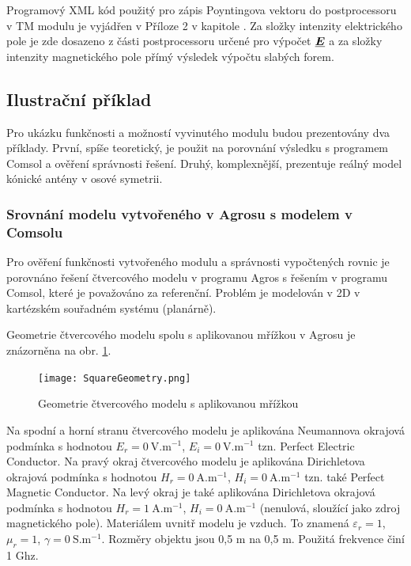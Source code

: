 \documentclass[12pt,a4paper,oneside]{article}
\numberwithin{equation}{section} %
\numberwithin{figure}{section} %
\numberwithin{table}{section} %
\renewcommand{\vec}[1]{\mbox{\boldmath$#1$}} %
\newcommand{\faz}[1]{{\underline{#1}}} %
\begin{document}
Programový XML kód použitý pro zápis Poyntingova vektoru do postprocessoru v TM modulu je vyjádřen v Příloze 2 v kapitole . Za složky intenzity elektrického pole je zde dosazeno z části postprocessoru určené pro výpočet $\faz{\vec{E}}$ a za složky intenzity magnetického pole přímý výsledek výpočtu slabých forem.



\subsection{Ilustrační příklad}
Pro ukázku funkčnosti a možností vyvinutého modulu budou prezentovány dva příklady. První, spíše teoretický, je použit na porovnání výsledku s programem Comsol a ověření správnosti řešení. Druhý, komplexnější, prezentuje reálný model kónické antény v osové symetrii. 

\subsubsection{Srovnání modelu vytvořeného v Agrosu s modelem v Comsolu}
\label{srovnani}
Pro ověření funkčnosti vytvořeného modulu a správnosti vypočtených rovnic je porovnáno řešení čtvercového modelu v programu Agros s řešením v programu Comsol, které je považováno za referenční. Problém je modelován v 2D v kartézském souřadném systému (planárně).

Geometrie čtvercového modelu spolu s aplikovanou mřížkou v Agrosu je znázorněna na obr. \ref{meshedSQ}. 

\begin{figure}
\begin{center}
\texttt{[image: SquareGeometry.png]} 
\caption{Geometrie čtvercového modelu s aplikovanou mřížkou} 
\label{meshedSQ}
\end{center}
\end{figure}

Na spodní a horní stranu čtvercového modelu je aplikována Neumannova okrajová podmínka s hodnotou $E_r = 0 ~ \mathrm{V.m^{-1}}$, $E_i = 0 ~ \mathrm{V.m^{-1}}$ tzn. Perfect Electric Conductor. Na pravý okraj čtvercového modelu je aplikována Dirichletova okrajová podmínka s hodnotou $H_r = 0 ~ \mathrm{A.m^{-1}}$, $H_i = 0 ~ \mathrm{A.m^{-1}}$ tzn. také Perfect Magnetic Conductor. Na levý okraj je také aplikována Dirichletova okrajová podmínka s hodnotou $H_r = 1 ~ \mathrm{A.m^{-1}}$, $H_i = 0 ~ \mathrm{A.m^{-1}}$ (nenulová, sloužící jako zdroj magnetického pole). Materiálem uvnitř modelu je vzduch. To znamená $\varepsilon _r = 1$, $\mu _r = 1$, $\gamma = 0 ~ \mathrm{S.m^{-1}}$. Rozměry objektu jsou 0,5 m na 0,5 m. Použitá frekvence činí 1 Ghz. 
\end{document}
